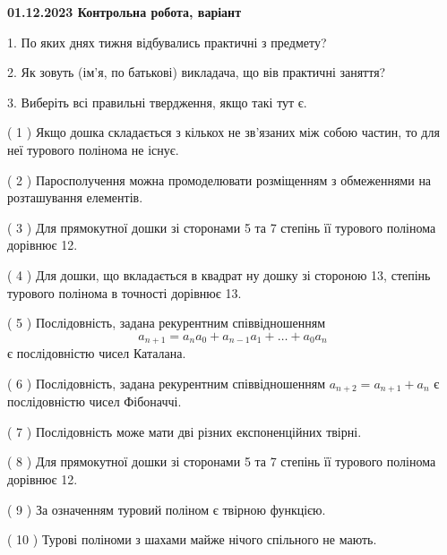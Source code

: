 \documentclass[12pt, ukrainian]{article}
\begin{document}
\vspace{4mm}
\newpage
\begin {large}

\textbf{01.12.2023 Контрольна робота, варіант  }\par


{
1. По яких днях тижня відбувались практичні з предмету?



\vspace{5mm}
2. Як зовуть (ім'я, по батькові) викладача, що вів практичні заняття?



\vspace{5mm}
3. Виберіть всі правильні твердження, якщо такі тут є.\par
\vspace{2mm}
( 1 ) Якщо дошка складається з кількох не зв’язаних між собою частин, то для неї турового полінома не існує.%

( 2 ) Паросполучення можна промоделювати розміщенням з обмеженнями на розташування елементів.%

( 3 ) Для прямокутної дошки зі сторонами 5 та 7 степінь її турового полінома дорівнює 12.%

( 4 ) Для дошки, що вкладається в квадрат ну дошку зі стороною 13, степінь турового полінома в точності дорівнює 13.%

( 5 ) Послідовність, задана рекурентним співвідношенням $$a_{n+1}=a_{n}a_{0}+a_{n-1}a_{1}+\ldots+a_0a_{n}$$ є послідовністю чисел Каталана.%

( 6 ) Послідовність, задана рекурентним співвідношенням $a_{n+2}=a_{n+1}+a_{n}$ є послідовністю чисел Фібоначчі.%

( 7 ) Послідовність може мати дві різних експоненційних твірні.%

( 8 ) Для прямокутної дошки зі сторонами 5 та 7 степінь її турового полінома дорівнює 12.%

( 9 ) За означенням туровий поліном є твірною функцією.%

( 10 ) Турові поліноми з шахами майже нічого спільного не мають.%
}
\end {large}
\end{document}

